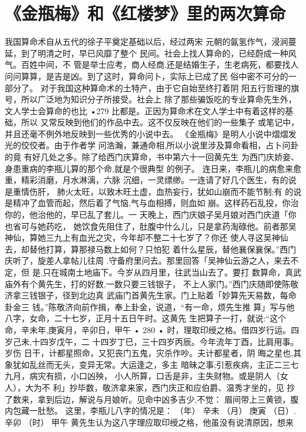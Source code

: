 \section{《金瓶梅》和《红楼梦》里的两次算命}
我国算命术自从五代的徐子平奠定基础以后，经过两宋
元朝的氤氢作气，浸涧蔓延，到了明清之时，早已风靡了整个
民间。社会上找人算命的，已经蔚成一种风气。百姓中间，不
管是举士应考，商人经商,还是结婚生子，生老病死，都要找人
问问算算，是吉是凶。到了这时，算命问卜，实际上已成了民
俗中密不可分的一部分了。
对于我国这种算命术的土特产，由于它自始至终打着阴
阳五行哲理的旗号，所以广泛地为知识分子所接受。社会上
除了那些骗饭吃的专业算命先生外，文人学士会算命的也比
•279
比都是。正因为算命术在文人学士中有着这样的基础，所以
又常反映到他们的作品中去。这不仅反映在他们的一些集子
或笔记中，并且还毫不例外地反映到一些优秀的小说中去。
《金瓶梅》是明人小说中熠熠发光的佼佼者。由于作者学
问浩瀚，兼通命相,所以小说里涉及算命看相，占卜问卦的竟
有好几处之多。除了给西门庆算命，书中第六十一回黄先生
为西门庆娇妾、身患重病的李瓶儿算的那个命,就是个很典型
的例子。
连日来，李瓶儿的病愈来愈重，精彩消磨，月水淋漓，六脉
沉细，一灵缥缈。一连请了好几个医生，有的说是重情伤肝，
肺火太旺，以致木旺土虚，血热妄行，犹如山崩而不能节制;有
的说是精冲了血管而起，然后着了气恼,气与血相搏，则血如
崩。这样药石乱投，你治你的，他治他的，早已乱了套儿。一 天晚上，西门庆娘子吴月娘对西门庆道「你也省可与她药吃，
她饮食先阻住了，肚腹中什么儿，只是拿药淘碌他。前者那吴
神仙，算她三九上有血光之灾，今年却不整二十七岁了？你还
使人寻这吴神仙去，却替他打算，算那禄马数上如何？只怕犯
着什么星辰，替他襄保襄保。”西门庆听了，旋差人拿帖儿往周
.守备府里问去。那里回答「吴神仙云游之人，来去不定，但
是,只在城南土地庙下。今岁从四月里，往武当山去了。要打
数算命，真武庙外有个黄先生，打的好数,一数只要三钱银子，
不上人家门。”西门庆随即使陈敬济拿三钱银子，径到北边真
武庙门首黄先生家。门上贴着「妙算先天易数，每命卦金三
钱。”陈敬济向前作揖，奉上卦金，说道，“有一命，烦先生推
算」写与他八字，女命，二十七岁，正月十五日午时。这黄先
生把算子一打，就说:“这个命，辛未年,庚寅月，辛卯日，甲午
• 280 •
时，理取印绶之格。借四岁行运。四岁己未,十四岁戊午，二
十四岁丁巳，三十四岁丙辰。今年流年丁酉，比肩用事。岁伤
日干，计都星照命，又犯丧门五鬼，灾杀作吵。夫计都星者，阴
晦之星也,其象犹如乱丝而无头，变异无常。大运逢之，多主
暗昧之事;引惹疾病，主正二三七九月，病灾有损，小口凶殃，
小人所算，口舌是非，主失财物。或是阴人（女人），大为不
利」抄毕数，敬济拿来家，西门庆正和应伯爵、温秀才坐的，见
抄了数来，拿到后边，解说与月娘听。见命中凶多吉少,不觉：
眉间带上三黄锁，腹内包藏一肚愁。
这里，李瓶儿八字的情况是：
（年） 辛未
（月） 庚寅
（日）.辛卯
（时） 甲午
黄先生认为这八字理应取印绶之格，他虽没有说清原因，想来
